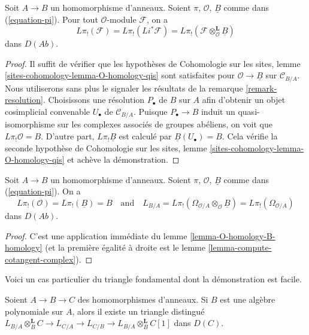 \begin{lemma}
\label{lemma-O-homology-B-homology}
Soit $A \to B$ un homomorphisme d'anneaux. Soient $\pi$, $\mathcal{O}$,
$\underline{B}$ comme dans (\ref{equation-pi}). Pour tout $\mathcal{O}$-module
$\mathcal{F}$, on a
$$
L\pi_!(\mathcal{F}) = L\pi_!(Li^*\mathcal{F}) =
L\pi_!(\mathcal{F} \otimes_\mathcal{O}^\mathbf{L} \underline{B})
$$
dans $D(\textit{Ab})$.
\end{lemma}

\begin{proof}
Il suffit de vérifier que les hypothèses de Cohomologie sur les sites, lemme
\ref{sites-cohomology-lemma-O-homology-qis}
sont satisfaites pour $\mathcal{O} \to \underline{B}$ sur
$\mathcal{C}_{B/A}$. Nous utiliserons sans plus le signaler les résultats de
la remarque \ref{remark-resolution}. Choisissons une résolution $P_\bullet$
de $B$ sur $A$ afin d'obtenir un objet cosimplicial convenable $U_\bullet$ de
$\mathcal{C}_{B/A}$. Puisque $P_\bullet \to B$ induit un quasi-isomorphisme
sur les complexes associés de groupes abéliens, on voit que
$L\pi_!\mathcal{O} = B$. D'autre part, $L\pi_!\underline{B}$ est calculé par
$\underline{B}(U_\bullet) = B$. Cela vérifie la seconde hypothèse de
Cohomologie sur les sites, lemme
\ref{sites-cohomology-lemma-O-homology-qis}
et achève la démonstration.
\end{proof}

\begin{lemma}
\label{lemma-apply-O-B-comparison}
Soit $A \to B$ un homomorphisme d'anneaux. Soient $\pi$, $\mathcal{O}$,
$\underline{B}$ comme dans (\ref{equation-pi}). On a
$$
L\pi_!(\mathcal{O}) = L\pi_!(\underline{B}) = B
\quad\text{and}\quad
L_{B/A} = L\pi_!(\Omega_{\mathcal{O}/A} \otimes_\mathcal{O} \underline{B}) =
L\pi_!(\Omega_{\mathcal{O}/A})
$$
dans $D(\textit{Ab})$.
\end{lemma}

\begin{proof}
C'est une application immédiate du lemme
\ref{lemma-O-homology-B-homology} (et la première égalité à droite est le
lemme \ref{lemma-compute-cotangent-complex}).
\end{proof}

\noindent
Voici un cas particulier du triangle fondamental dont la démonstration est
facile.

\begin{lemma}
\label{lemma-special-case-triangle}
Soient $A \to B \to C$ des homomorphismes d'anneaux. Si $B$ est une algèbre
polynomiale sur $A$, alors il existe un triangle distingué 
$L_{B/A} \otimes_B^\mathbf{L} C \to L_{C/A} \to L_{C/B} \to
L_{B/A} \otimes_B^\mathbf{L} C[1]$ dans $D(C)$.
\end{lemma}

